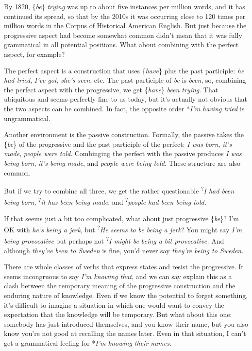 By 1820, \{\textit{be}\} \textit{trying} was up to about five instances per million words, and it has continued its spread, so that by the 2010s it was occurring close to 120 times per million words in the Corpus of Historical American English. But just because the progressive aspect had become somewhat common didn't mean that it was fully grammatical in all potential positions. What about combining with the perfect aspect, for example?

The perfect aspect is a construction that uses \{\textit{have}\} plus the past participle: \textit{he had tried}, \textit{I've got}, \textit{she's seen}, etc. The past participle of \textit{be} is \textit{been}, so, combining the perfect aspect with the progressive, we get \{\textit{have}\} \textit{been trying}. That ubiquitous and seems perfectly fine to us today, but it's actually not obvious that the two aspects can be combined. In fact, the opposite order *\textit{I'm having tried} is ungrammatical.

Another environment is the passive construction. Formally, the passive takes the \{\textit{be}\} of the progressive and the past participle of the perfect: \textit{I was born}, \textit{it's made}, \textit{people were told}. Combinging the perfect with the passive produces \textit{I was being born}, \textit{it's being made}, and \textit{people were being told}. These structure are also common.

But if we try to combine all three, we get the rather questionable \textsuperscript{?}\textit{I had been being born}, \textsuperscript{?}\textit{it has been being made}, and \textsuperscript{?}\textit{people had been being told.}

If that seems just a bit too complicated, what about just progressive \{\textit{be}\}? I'm OK with \textit{he's being a jerk}, but \textsuperscript{?}\textit{He seems to be being a jerk}? You might say \textit{I'm being provocative} but perhaps not \textsuperscript{?}\textit{I might be being a bit provocative.} And although \textit{they've been to Sweden} is fine, you'd never say \textit{they're being to Sweden}.

There are whole classes of verbs that express states and resist the progressive. It seems incongruous to say \textit{I'm knowing that}, and we can say explain this as a clash between the temporary meaning of the progressive construction and the enduring nature of knowledge. Even if we know the potential to forget something, it's difficult to imagine a situation in which one would want to convey the expectation that the knowledge will be temporary. But what about this one: somebody has just introduced themselves, and you know their name, but you also know you're not good at recalling the names later. Even in that situation, I can't get a grammatical feeling for *\textit{I'm knowing their names.}

